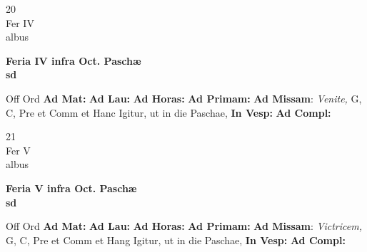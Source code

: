 \documentclass[10pt, openany]{book}
\begin{document}
    \begin{center}
        \begin{minipage}{3.5in}
            \vspace{2em}
            \begin{minipage}{0.5in}
                {\Huge 20} \\
                {\normalsize Fer IV} \\
                {\normalsize albus}
            \end{minipage}
            \begin{minipage}{3.0in}
                \textbf{ \large Feria IV infra Oct. Paschæ \\
                \textnormal{\normalsize sd}} \\ 
            \end{minipage}
            \begin{justify}Off Ord
                \textbf{Ad Mat: }
                \textbf{Ad Lau: }
                \textbf{Ad Horas: }
                \textbf{Ad Primam: }\textbf{Ad Missam}: \textit{Venite,} G, C, Pre et Comm et Hanc Igitur, ut in die Paschae,  
                \textbf{In Vesp: }
                \textbf{Ad Compl: }
            \end{justify}
        \end{minipage}
    \end{center}

    \begin{center}
        \begin{minipage}{3.5in}
            \vspace{2em}
            \begin{minipage}{0.5in}
                {\Huge 21} \\
                {\normalsize Fer V} \\
                {\normalsize albus}
            \end{minipage}
            \begin{minipage}{3.0in}
                \textbf{ \large Feria V infra Oct. Paschæ \\
                \textnormal{\normalsize sd}} \\ 
            \end{minipage}
            \begin{justify}Off Ord
                \textbf{Ad Mat: }
                \textbf{Ad Lau: }
                \textbf{Ad Horas: }
                \textbf{Ad Primam: }\textbf{Ad Missam}: \textit{Victricem,} G, C, Pre et Comm et Hang Igitur, ut in die Paschae,  
                \textbf{In Vesp: }
                \textbf{Ad Compl: }
            \end{justify}
        \end{minipage}
    \end{center}
\end{document}
